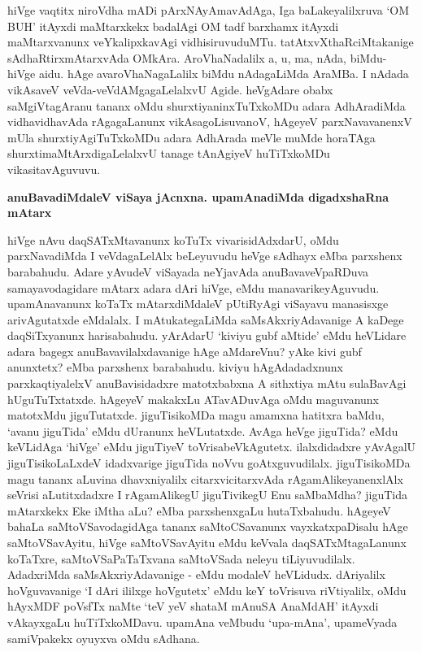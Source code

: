 hiVge vaqtitx niroVdha mADi pArxNAyAmavAdAga, Iga baLakeyalilxruva `OM BUH' itAyxdi maMtarxkekx badalAgi OM tadf barxhamx itAyxdi maMtarxvanunx veYkalipxkavAgi vidhisiruvuduMTu. tatAtxvXthaRciMtakanige sAdhaRtirxmAtarxvAda OMkAra. AroVhaNadalilx a, u, ma, nAda, biMdu- hiVge aidu. hAge avaroVhaNagaLalilx biMdu nAdagaLiMda AraMBa. I nAdada vikAsaveV veVda-veVdAMgagaLelalxvU Agide. heVgAdare obabx saMgiVtagAranu tananx oMdu shurxtiyaninxTuTxkoMDu adara AdhAradiMda vidhavidhavAda rAgagaLanunx vikAsagoLisuvanoV, hAgeyeV parxNavavanenxV mUla shurxtiyAgiTuTxkoMDu adara AdhArada meVle muMde horaTAga shurxtimaMtArxdigaLelalxvU tanage tAnAgiyeV huTiTxkoMDu vikasitavAguvuvu.

{\bf anuBavadiMdaleV viSaya jAcnxna. upamAnadiMda digadxshaRna mAtarx}

hiVge nAvu daqSATxMtavanunx koTuTx vivarisidAdxdarU, oMdu parxNavadiMda I veVdagaLelAlx beLeyuvudu heVge sAdhayx eMba parxshenx barabahudu. Adare yAvudeV viSayada neYjavAda anuBavaveVpaRDuva samayavodagidare mAtarx adara dAri hiVge, eMdu manavarikeyAguvudu. upamAnavanunx koTaTx mAtarxdiMdaleV pUtiRyAgi viSayavu manasisxge arivAgutatxde eMdalalx. I mAtukategaLiMda saMsAkxriyAdavanige A kaDege daqSiTxyanunx harisabahudu. yArAdarU `kiviyu gubf aMtide' eMdu heVLidare adara bagegx anuBavavilalxdavanige hAge aMdareVnu? yAke kivi gubf anunxtetx? eMba parxshenx barabahudu. kiviyu hAgAdadadxnunx parxkaqtiyalelxV anuBavisidadxre matotxbabxna A sithxtiya mAtu sulaBavAgi hUguTuTxtatxde. hAgeyeV makakxLu ATavADuvAga oMdu maguvanunx matotxMdu jiguTutatxde. jiguTisikoMDa magu amamxna hatitxra baMdu, `avanu jiguTida' eMdu dUranunx heVLutatxde. AvAga heVge jiguTida? eMdu keVLidAga `hiVge' eMdu jiguTiyeV toVrisabeVkAgutetx. ilalxdidadxre yAvAgalU jiguTisikoLaLxdeV idadxvarige jiguTida noVvu goAtxguvudilalx. jiguTisikoMDa magu tananx aLuvina dhavxniyalilx citarxvicitarxvAda rAgamAlikeyanenxlAlx seVrisi aLutitxdadxre I rAgamAlikegU jiguTivikegU Enu saMbaMdha? jiguTida mAtarxkekx Eke iMtha aLu? eMba parxshenxgaLu hutaTxbahudu. hAgeyeV bahaLa saMtoVSavodagidAga tananx saMtoCSavanunx vayxkatxpaDisalu hAge saMtoVSavAyitu, hiVge saMtoVSavAyitu eMdu keVvala daqSATxMtagaLanunx koTaTxre, saMtoVSaPaTaTxvana saMtoVSada neleyu tiLiyuvudilalx. AdadxriMda saMsAkxriyAdavanige - eMdu modaleV heVLidudx. dAriyalilx hoVguvavanige `I dAri ililxge hoVgutetx' eMdu keY toVrisuva riVtiyalilx, oMdu hAyxMDF poVsfTx naMte `teV yeV shataM mAnuSA AnaMdAH' itAyxdi vAkayxgaLu huTiTxkoMDavu. upamAna veMbudu `upa-mAna', upameVyada samiVpakekx oyuyxva oMdu sAdhana.

